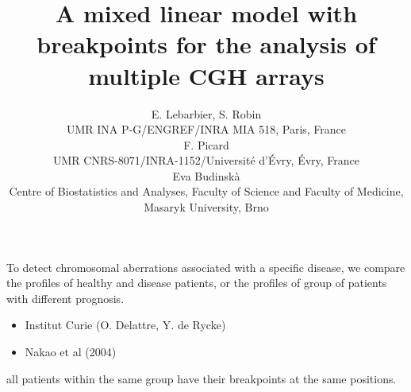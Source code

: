 \documentclass[17pt,landscape]{foils}
\title{\large{A mixed linear model with breakpoints for the
analysis of multiple CGH arrays}}
\author{ E. Lebarbier, S. Robin \\
      \footnotesize {UMR INA P-G/ENGREF/INRA MIA 518, Paris, France} \\
      F. Picard \\
      \footnotesize {UMR CNRS-8071/INRA-1152/Universit\'e d'\'Evry, \'Evry, France}\\
      Eva Budinsk\`a \\
      \footnotesize {Centre of Biostatistics and Analyses, Faculty of Science and Faculty
of Medicine, Masaryk University, Brno}   }
\date{}
\begin{document}
\maketitle \MyLogo{}
\newcommand{\textblue}[1]{\textcolor{blue}{#1}}
\newcommand{\section}[1]{\centerline{\large \textblue{#1}}}
\newcommand{\paragraph}[1]{\noindent {\textblue{#1}}}
\newcommand{\textred}[1]{\textcolor{red}{#1}}
\newcommand{\textgreen}[1]{\textcolor{green}{ #1}}

\newpage
{} \foilhead[-.5in]{}

\vspace{1cm}

\paragraph{Example : comparing groups of patients}
To detect chromosomal aberrations associated with a specific
disease, we compare the profiles of healthy and disease patients, or
the profiles of group of patients with different prognosis.


\paragraph{Data.}
\begin{itemize}
\item Institut Curie (O. Delattre, Y. de Rycke)

\item Nakao et al (2004) \\

\end{itemize}


\paragraph{First approach : Common breakpoints:} all patients within the same group have their breakpoints at the
same positions.
\end{document}

